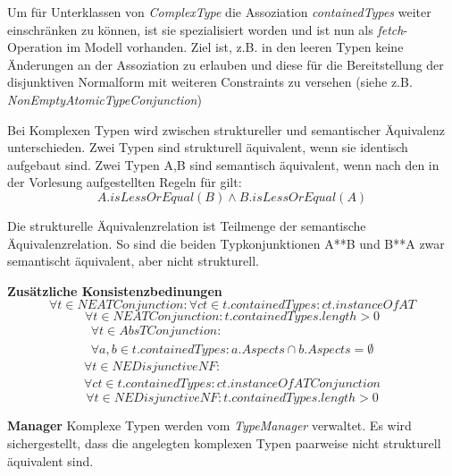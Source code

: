 Um für Unterklassen von \emph{ComplexType} die Assoziation \emph{containedTypes} weiter einschränken zu 
können, ist sie spezialisiert worden und ist nun als \emph{fetch}-Operation im Modell vorhanden. 
Ziel ist, z.B. in den leeren Typen keine Änderungen an der Assoziation zu erlauben und diese für die Bereitstellung 
der disjunktiven Normalform mit weiteren Constraints zu versehen (siehe z.B. \emph{NonEmptyAtomicTypeConjunction}) 

Bei Komplexen Typen wird zwischen struktureller und semantischer Äquivalenz unterschieden. Zwei Typen sind strukturell 
äquivalent, wenn sie identisch aufgebaut sind. Zwei Typen A,B sind semantisch äquivalent, wenn nach den in der Vorlesung 
aufgestellten Regeln für  gilt: 
\begin{equation}A.isLessOrEqual(B) \land B.isLessOrEqual(A)
\end{equation}

Die strukturelle Äquivalenzrelation ist Teilmenge der semantische Äquivalenzrelation.
So sind die beiden Typkonjunktionen A**B und B**A zwar semantischt äquivalent, aber nicht strukturell.

\textbf{Zusätzliche Konsistenzbedinungen} \newline
\begin{equation}\forall t \in NEATConjunction : 
	\forall ct \in t.containedTypes : ct.instanceOf AT
\end{equation}
\begin{equation}\forall t \in NEATConjunction : 
	t.containedTypes.length > 0
\end{equation}
\begin{equation}
\begin{split}
	\forall t \in AbsTConjunction :\\ 
	\forall a,b \in t.containedTypes : a.Aspects \cap b.Aspects = \emptyset
\end{split}
\end{equation}
\begin{equation}
\begin{split}
	\forall t \in NEDisjunctiveNF :\\ 
	\forall ct \in t.containedTypes : ct.instanceOf ATConjunction
\end{split}
\end{equation}
\begin{equation}\forall t \in NEDisjunctiveNF : 
	t.containedTypes.length > 0
\end{equation}


\textbf{Manager} \newline
Komplexe Typen werden vom \emph{TypeManager} verwaltet. Es wird sichergestellt, dass 
die angelegten komplexen Typen paarweise nicht strukturell äquivalent sind. 

